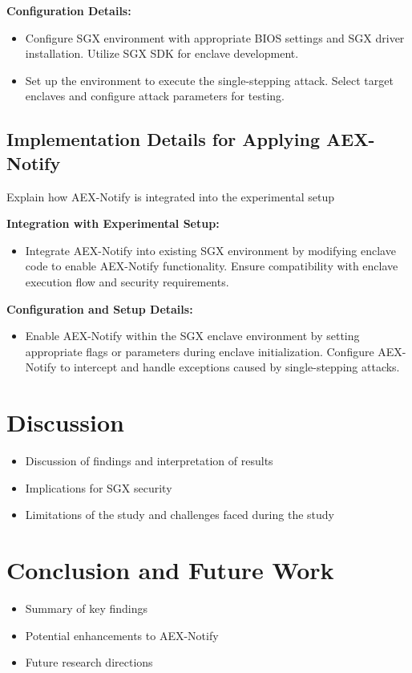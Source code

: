 \documentclass{llncs}
\begin{document}
\textbf{Configuration Details:}
\begin{itemize}
  \item Configure SGX environment with appropriate BIOS settings and SGX driver installation. Utilize SGX SDK for enclave development.
  \item Set up the environment to execute the single-stepping attack. Select target enclaves and configure attack parameters for testing.
\end{itemize}

\subsection{Implementation Details for Applying AEX-Notify}

Explain how AEX-Notify is integrated into the experimental setup

\textbf{Integration with Experimental Setup:}
\begin{itemize}
  \item Integrate AEX-Notify into existing SGX environment by modifying enclave code to enable AEX-Notify functionality. Ensure compatibility with enclave execution flow and security requirements.
\end{itemize}

\textbf{Configuration and Setup Details:}
\begin{itemize}
  \item Enable AEX-Notify within the SGX enclave environment by setting appropriate flags or parameters during enclave initialization. Configure AEX-Notify to intercept and handle exceptions caused by single-stepping attacks.
\end{itemize}

\section{Discussion}
\begin{itemize}
  \item Discussion of findings and interpretation of results
  \item Implications for SGX security
  \item Limitations of the study and challenges faced during the study
\end{itemize}

\section{Conclusion and Future Work}
\begin{itemize}
    \item Summary of key findings
    \item Potential enhancements to AEX-Notify
    \item Future research directions
\end{itemize}


%

\end{document}
